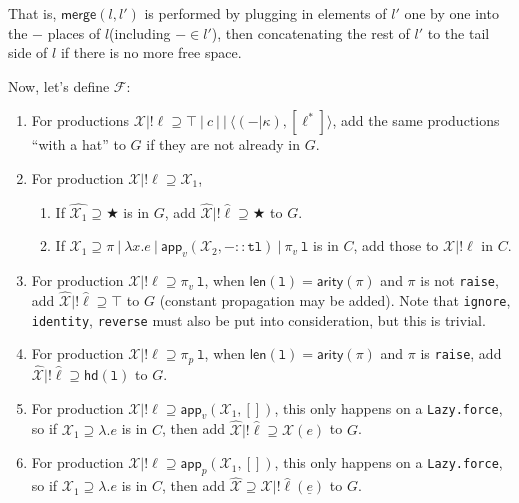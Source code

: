 \documentclass[a4paper]{article}
\newcommand*\vbar{|}
\begin{document}
That is, $\mathsf{merge}(l,l')$ is performed by plugging in elements of $l'$ one by one into the $-$ places of $l$(including $-\in l'$), then concatenating the rest of $l'$ to the tail side of $l$ if there is no more free space.

Now, let's define $\mathcal{F}$:

\begin{enumerate}
    \item For productions $\mathcal{X}\vbar!\ell\supseteq\top\:\vbar\: c\:\vbar\:\vbar\:\langle(-\vbar\kappa),[\ell^*]\rangle$, add the same productions ``with a hat'' to $G$ if they are not already in $G$.
    \item For production $\mathcal{X}\vbar!\ell\supseteq\mathcal{X_1}$,
    \begin{enumerate}
        \item If $\hat{\mathcal{X_1}}\supseteq\bigstar$ is in $G$, add $\hat{\mathcal{X}}\vbar!\hat{\ell}\supseteq\bigstar$ to $G$.
        \item If $\mathcal{X}_1\supseteq \pi\:\vbar\:\lambda x.e\:\vbar\:\mathsf{app}_v(\mathcal{X}_2,-::\mathtt{tl})\:\vbar\:\pi_v\:\mathtt{l}$ is in $C$, add those to $\mathcal{X}\vbar!\ell$ in $C$.
    \end{enumerate}
    \item For production $\mathcal{X}\vbar!\ell\supseteq\pi_v\:\mathtt{l}$, when $\mathsf{len}(\mathtt{l})=\mathsf{arity}(\pi)$ and $\pi$ is not \texttt{raise}, add $\hat{\mathcal{X}}\vbar!\hat{\ell}\supseteq\top$ to $G$ (constant propagation may be added). Note that \texttt{ignore}, \texttt{identity}, \texttt{reverse} must also be put into consideration, but this is trivial.
    \item For production $\mathcal{X}\vbar!\ell\supseteq\pi_p\:\mathtt{l}$, when $\mathsf{len}(\mathtt{l})=\mathsf{arity}(\pi)$ and $\pi$ is \texttt{raise}, add $\hat{\mathcal{X}}\vbar!\hat{\ell}\supseteq\mathsf{hd}(\mathtt{l})$ to $G$.
    \item For production $\mathcal{X}\vbar!\ell\supseteq\mathsf{app}_v(\mathcal{X_1},[])$, this only happens on a \texttt{Lazy.force}, so if $\mathcal{X_1}\supseteq\lambda.e$ is in $C$, then add $\hat{\mathcal{X}}\vbar!\hat{\ell}\supseteq\mathcal{X}(e)$ to $G$.
    \item For production $\mathcal{X}\vbar!\ell\supseteq\mathsf{app}_p(\mathcal{X_1},[])$, this only happens on a \texttt{Lazy.force}, so if $\mathcal{X_1}\supseteq\lambda.e$ is in $C$, then add $\hat{\mathcal{X}}\supseteq\mathcal{X}\vbar!\hat{\ell}(\underline{e})$ to $G$.

\end{enumerate}
\end{document}
